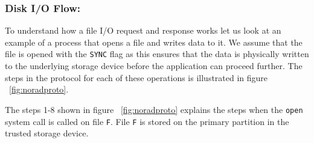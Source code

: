 \documentclass[withindex,glossary]{cam-thesis}
\begin{document}
\subsubsection{Disk I/O Flow:}

To understand how a file I/O request and response works let us look at an example of a process that opens a file and writes data to it.
We assume that the file is opened with the \texttt{SYNC} flag as this ensures that the data is physically written to the underlying storage device before the application can proceed further.
The steps in the protocol for each of these operations is illustrated in figure ~\ref{fig:noradproto}.

The steps 1-8 shown in figure ~\ref{fig:noradproto} explains the steps when the \texttt{open} system call is called on file \texttt{F}.
File \texttt{F} is stored on the primary partition in the trusted storage device.
\end{document}
